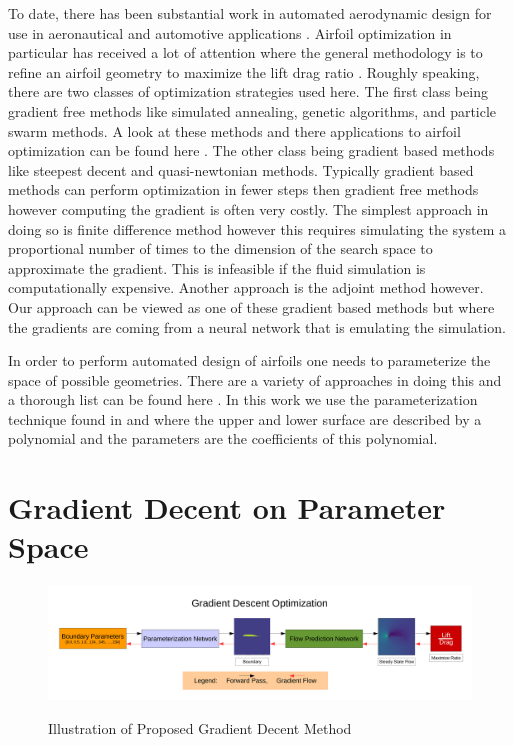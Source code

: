 \documentclass{article} %
\begin{document}
To date, there has been substantial work in automated aerodynamic design for use in aeronautical and automotive applications \cite{ando2010automotive} \cite{demultiplexer}. Airfoil optimization in particular has received a lot of attention where the general methodology is to refine an airfoil geometry to maximize the lift drag ratio \cite{drela1998pros}. Roughly speaking, there are two classes of optimization strategies used here. The first class being gradient free methods like simulated annealing, genetic algorithms, and particle swarm methods. A look at these methods and there applications to airfoil optimization can be found here \cite{mukesh2012application}. The other class being gradient based methods like steepest decent and quasi-newtonian methods. Typically gradient based methods can perform optimization in fewer steps then gradient free methods however computing the gradient is often very costly. The simplest approach in doing so is finite difference method however this requires simulating the system a proportional number of times to the dimension of the search space to approximate the gradient. This is infeasible if the fluid simulation is computationally expensive. Another approach is the adjoint method however. Our approach can be viewed as one of these gradient based methods but where the gradients are coming from a neural network that is emulating the simulation.

In order to perform automated design of airfoils one needs to parameterize the space of possible geometries. There are a variety of approaches in doing this and a thorough list can be found here \cite{salunke2014airfoil}. In this work we use the parameterization technique found in \cite{lane2009surface} and \cite{hilton2007universal} where the upper and lower surface are described by a polynomial and the parameters are the coefficients of this polynomial.

\section{Gradient Decent on Parameter Space}

\begin{figure}[h]
\begin{center}
\includegraphics[scale=0.34]{./gradient_descent_optimization.pdf}
\label{gradient_descent_optimization}
\end{center}
\caption{Illustration of Proposed Gradient Decent Method}
\end{figure}
\end{document}
